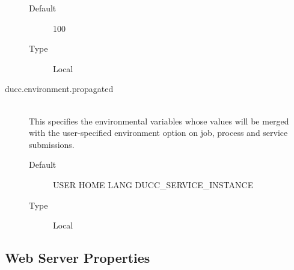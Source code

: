 \begin{description}
         \begin{description}
           \item[Default] 100
           \item[Type] Local 
         \end{description}


       \item[ducc.environment.propagated] \hfill \\
         This specifies the environmental variables whose values will be merged with the
         user-specified environment option on job, process and service submissions.

         \begin{description}
           \item[Default] USER HOME LANG DUCC\_SERVICE\_INSTANCE
           \item[Type] Local 
         \end{description}
                                                                        
      \end{description}  
        

\subsection{Web Server Properties}

